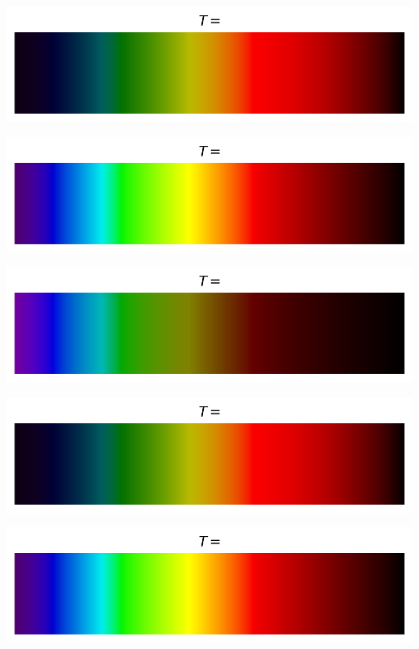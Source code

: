 \documentclass[12pt,a4paper,fleqn]{article}
\begin{document}
\begin{landscape}
\begin{center}
\begin{multicols}{3}
\includegraphics[width=\linewidth]{images/spectrum_black_body_temp3000K_notemp.png}

\includegraphics[width=\linewidth]{images/spectrum_black_body_temp5000K_notemp.png}

\includegraphics[width=\linewidth]{images/spectrum_black_body_temp10000K_notemp.png}
\end{multicols}
\end{center}

\begin{center}
\begin{multicols}{3}
\includegraphics[width=\linewidth]{images/spectrum_black_body_temp3000K_notemp.png}

\includegraphics[width=\linewidth]{images/spectrum_black_body_temp5000K_notemp.png}


\end{multicols}
\end{center}
\end{landscape}
\end{document}
